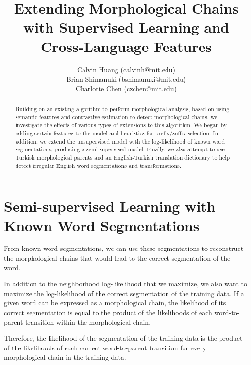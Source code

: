 \documentclass[10pt,twocolumn]{article}
\begin{document}
\title{Extending Morphological Chains with Supervised Learning and Cross-Language Features}

\author{Calvin Huang (calvinh@mit.edu)\\
    Brian Shimanuki (bshimanuki@mit.edu)\\
    Charlotte Chen (czchen@mit.edu)
\\
}

\maketitle
\thispagestyle{empty}

\begin{abstract}
    Building on an existing algorithm to perform morphological analysis,
    based on using semantic features and contrastive estimation to detect morphological chains,
    we investigate the effects of various types of extensions to this algorithm.
    We began by adding certain features to the model and heuristics for prefix/suffix selection.
    In addition, we extend the unsupervised model with the log-likelihood of known word segmentations,
    producing a semi-supervised model.
    Finally, we also attempt to use Turkish morphological parents and an English-Turkish translation
    dictionary to help detect irregular English word segmentations and transformations.
\end{abstract}


\section{Semi-supervised Learning with Known Word Segmentations}
From known word segmentations, we can use these segmentations to reconstruct
the morphological chains that would lead to the correct segmentation of the word.

In addition to the neighborhood log-likelihood that we maximize,
we also want to maximize the log-likelihood of the correct segmentation of the training data.
If a given word can be expressed as a morphological chain, the likelihood of its correct segmentation
is equal to the product of the likelihoods of each word-to-parent transition within the morphological chain.

Therefore, the likelihood of the segmentation of the training data is the product of the likelihoods
of each correct word-to-parent transition for every morphological chain in the training data.
\end{document}
